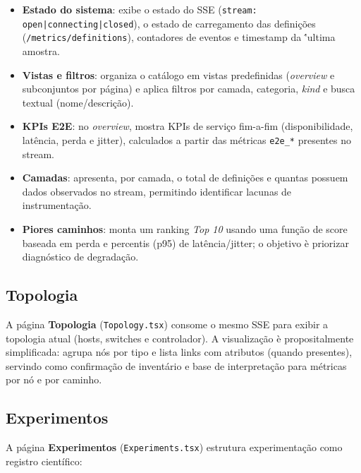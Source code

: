 \documentclass[12pt,oneside]{report}
\begin{document}
\begin{itemize}
\item \textbf{Estado do sistema}: exibe o estado do SSE (\texttt{stream: open|connecting|closed}), o estado de carregamento das defini\c{c}\~oes (\texttt{/metrics/definitions}), contadores de eventos e timestamp da \''ultima amostra.
\item \textbf{Vistas e filtros}: organiza o cat\'alogo em vistas predefinidas (\textit{overview} e subconjuntos por p\'agina) e aplica filtros por camada, categoria, \textit{kind} e busca textual (nome/descri\c{c}\~ao).
\item \textbf{KPIs E2E}: no \textit{overview}, mostra KPIs de servi\c{c}o fim-a-fim (disponibilidade, lat\^encia, perda e jitter), calculados a partir das m\'etricas \texttt{e2e\_*} presentes no stream.
\item \textbf{Camadas}: apresenta, por camada, o total de defini\c{c}\~oes e quantas possuem dados observados no stream, permitindo identificar lacunas de instrumenta\c{c}\~ao.
\item \textbf{Piores caminhos}: monta um ranking \textit{Top 10} usando uma fun\c{c}\~ao de score baseada em perda e percentis (p95) de lat\^encia/jitter; o objetivo \`e priorizar diagn\'ostico de degrada\c{c}\~ao.
\end{itemize}

\subsection{Topologia}
A p\'agina \textbf{Topologia} (\texttt{Topology.tsx}) consome o mesmo SSE para exibir a topologia atual (hosts, switches e controlador). A visualiza\c{c}\~ao \`e propositalmente simplificada: agrupa n\'os por tipo e lista links com atributos (quando presentes), servindo como confirma\c{c}\~ao de invent\'ario e base de interpreta\c{c}\~ao para m\'etricas por n\'o e por caminho.

\subsection{Experimentos}
A p\'agina \textbf{Experimentos} (\texttt{Experiments.tsx}) estrutura experimenta\c{c}\~ao como registro cient\'ifico:
\end{document}
